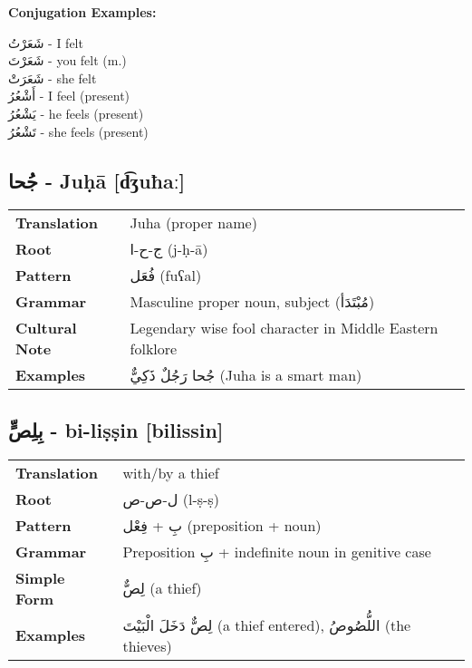 \documentclass[a4paper,12pt]{article}
\begin{document}
\textbf{Conjugation Examples:}
\begin{multicols}{2}
\small
\textarabic{شَعَرْتُ} - I felt \\
\textarabic{شَعَرْتَ} - you felt (m.) \\
\textarabic{شَعَرَتْ} - she felt \\
\textarabic{أَشْعُرُ} - I feel (present) \\
\textarabic{يَشْعُرُ} - he feels (present) \\
\textarabic{تَشْعُرُ} - she feels (present)
\end{multicols}

\subsection{\textarabic{جُحا} - \textbf{Juḥā} [d͡ʒuħaː]}

\begin{tabular}{p{3cm}p{10cm}}
\toprule
\textbf{Translation} & Juha (proper name) \\
\textbf{Root} & \textarabic{ج-ح-ا} (j-ḥ-ā) \\
\textbf{Pattern} & \textarabic{فُعَل} (fuʕal) \\
\textbf{Grammar} & Masculine proper noun, subject (\textarabic{مُبْتَدَأ}) \\
\textbf{Cultural Note} & Legendary wise fool character in Middle Eastern folklore \\
\textbf{Examples} & \textarabic{جُحا رَجُلٌ ذَكِيٌّ} (Juha is a smart man) \\
\bottomrule
\end{tabular}

\subsection{\textarabic{بِلِصٍّ} - \textbf{bi-liṣṣin} [bilissin]}

\begin{tabular}{p{3cm}p{10cm}}
\toprule
\textbf{Translation} & with/by a thief \\
\textbf{Root} & \textarabic{ل-ص-ص} (l-ṣ-ṣ) \\
\textbf{Pattern} & \textarabic{بِ} + \textarabic{فِعْل} (preposition + noun) \\
\textbf{Grammar} & Preposition \textarabic{بِ} + indefinite noun in genitive case \\
\textbf{Simple Form} & \textarabic{لِصٌّ} (a thief) \\
\textbf{Examples} & \textarabic{لِصٌّ دَخَلَ الْبَيْتَ} (a thief entered), \textarabic{اللُّصُوصُ} (the thieves) \\
\bottomrule
\end{tabular}
\end{document}
